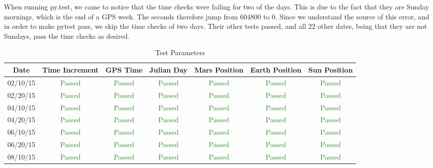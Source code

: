 \documentclass[]{BasiliskReportMemo}
\begin{document}
When running py.test, we came to notice that the time checks were failing for two of the days. This is due to the fact that they are Sunday mornings, which is the end of a GPS week. The seconds therefore jump from 604800 to 0. Since we understand the source of this error, and in order to make pytest pass, we skip the time checks of two days. Their other tests passed, and all 22 other dates, being that they are not Sundays, pass the time checks as desired. 

\begin{table}[htbp]
    \caption{Test Parameters}
   \label{tab:parameters}
        \centering \fontsize{10}{10}\selectfont
   \begin{tabular}{c | c | c | c | c | c | c} %
      \hline
      Date   & Time Increment &GPS Time& Julian Day & Mars Position & Earth Position & Sun Position \\
      \hline
      02/10/15 & \textcolor{ForestGreen}{Passed} & \textcolor{ForestGreen}{Passed} &  \textcolor{ForestGreen}{Passed}&  \textcolor{ForestGreen}{Passed} & \textcolor{ForestGreen}{Passed} &  \textcolor{ForestGreen}{Passed}\\
      02/20/15 & \textcolor{ForestGreen}{Passed} & \textcolor{ForestGreen}{Passed} &  \textcolor{ForestGreen}{Passed}&  \textcolor{ForestGreen}{Passed} & \textcolor{ForestGreen}{Passed} &  \textcolor{ForestGreen}{Passed}\\
      04/10/15 & \textcolor{ForestGreen}{Passed} & \textcolor{ForestGreen}{Passed} &  \textcolor{ForestGreen}{Passed}&  \textcolor{ForestGreen}{Passed} & \textcolor{ForestGreen}{Passed} &  \textcolor{ForestGreen}{Passed}\\
      04/20/15 & \textcolor{ForestGreen}{Passed} & \textcolor{ForestGreen}{Passed} &  \textcolor{ForestGreen}{Passed}&  \textcolor{ForestGreen}{Passed} & \textcolor{ForestGreen}{Passed} &  \textcolor{ForestGreen}{Passed}\\
      06/10/15 & \textcolor{ForestGreen}{Passed} & \textcolor{ForestGreen}{Passed} &  \textcolor{ForestGreen}{Passed}&  \textcolor{ForestGreen}{Passed} & \textcolor{ForestGreen}{Passed} &  \textcolor{ForestGreen}{Passed}\\
      06/20/15 & \textcolor{ForestGreen}{Passed} & \textcolor{ForestGreen}{Passed} &  \textcolor{ForestGreen}{Passed}&  \textcolor{ForestGreen}{Passed} & \textcolor{ForestGreen}{Passed} &  \textcolor{ForestGreen}{Passed}\\
      08/10/15 & \textcolor{ForestGreen}{Passed} & \textcolor{ForestGreen}{Passed} &  \textcolor{ForestGreen}{Passed}&  \textcolor{ForestGreen}{Passed} & \textcolor{ForestGreen}{Passed} &  \textcolor{ForestGreen}{Passed}\\

\end{tabular}
\end{table}
\end{document}
